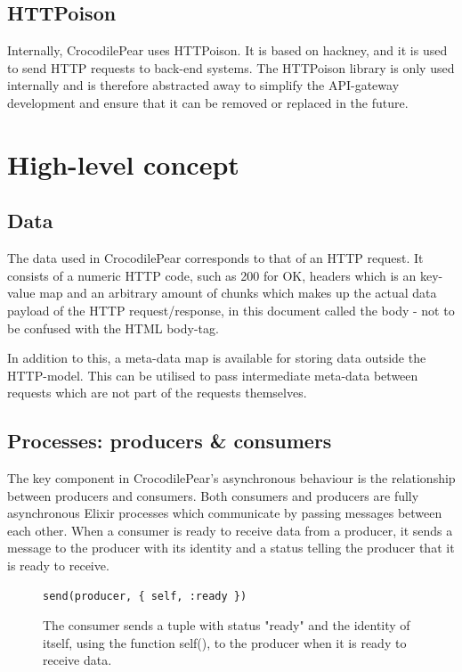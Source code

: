 \documentclass{cslthse-msc}
\begin{document}
\subsection{HTTPoison}
Internally, CrocodilePear uses HTTPoison\cite{httpoison}. It is based on hackney\cite{hackney}, and it is used to send HTTP requests to back-end systems. The HTTPoison library is only used internally and is therefore abstracted away to simplify the API-gateway development and ensure that it can be removed or replaced in the future.

\section{High-level concept}

\subsection{Data}
The data used in CrocodilePear corresponds to that of an HTTP request. It consists of a numeric HTTP code, such as 200 for OK, headers which is an key-value map and an arbitrary amount of chunks which makes up the actual data payload of the HTTP request/response, in this document called the body - not to be confused with the HTML body-tag. 

In addition to this, a meta-data map is available for storing data outside the HTTP-model. This can be utilised to pass intermediate meta-data between requests which are not part of the requests themselves.

\subsection{Processes: producers \& consumers}
The key component in CrocodilePear's asynchronous behaviour is the relationship between producers and consumers. Both consumers and producers are fully asynchronous Elixir processes which communicate by passing messages between each other. When a consumer is ready to receive data from a producer, it sends a message to the producer with its identity and a status telling the producer that it is ready to receive.

\begin{figure}[H]
  \centering
\begin{lstlisting}[breaklines=true,frame=single]
send(producer, { self, :ready })	
\end{lstlisting}
  \caption{The consumer sends a tuple with status "ready" and the identity of itself, using the function self(), to the producer when it is ready to receive data.}
\end{figure}
\end{document}
